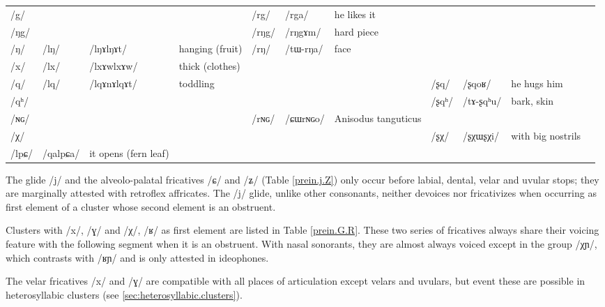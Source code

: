 \documentclass[oldfontcommands,oneside,a4paper,11pt]{article}
\newcommand{\ipa}[1]{{\phon/#1/}} %
\newcommand{\deux}[1]{/#1/}
\newcommand{\trois}[1]{/#1/}
\newcommand{\idph}[1]{\cellcolor{gray}\textbf{#1}}
\begin{document}
\begin{table}
{\begin{tabular}{l|lll|lll|lll|l}
\ipa{g}  & 	  & 	  & 	  & 	 \deux{rg}  & 	 \ipa{rga}  & 	 he likes it & 	 & 	 & 	 & 	\\	
\ipa{ŋg}  & 	  & 	  & 	  & 	 \deux{rŋg}  & 	 \ipa{rŋgɤm}  & 	hard piece  & 	 & 	 & 	 & 	\\	
\ipa{ŋ}  & 	 \deux{lŋ} \idph{}  & 	 \ipa{lŋɤlŋɤt}  & 	hanging (fruit)  & 	 \deux{rŋ}  & 	 \ipa{tɯ-rŋa}  & 	 face & 	 & 	 & 	 & 	\\	
\ipa{x}  & 	 \deux{lx} \idph{}  & 	 \ipa{lxɤwlxɤw}  & 	thick (clothes)  & 	  & 	  & 	  & 	 & 	 & 	 & 	\\	
\ipa{q}  & 	\deux{lq}  & \ipa{lqɤnɤlqɤt}	  &toddling	  & 	 & 	 & 	 & 	 \deux{ʂq}  & 	 \ipa{ʂqoʁ}  & 	he hugs him  & 	\\	
\ipa{qʰ}  & 	  & 	  & 	  & 	 & 	 & 	 & 	 \deux{ʂqʰ}  & 	 \ipa{tɤ-ʂqʰu}  & 	bark, skin & 	\\	
\ipa{ɴɢ}  & 	  & 	  & 	  & 	 \deux{rɴɢ}  & 	 \ipa{ɕɯrɴɢo}  & 	Anisodus tanguticus  & 	 & 	 & 	 & 	\\	
\ipa{χ}  & 	  & 	  & 	  & 	 & 	 & 	 & 	 \deux{ʂχ}  & 	 \ipa{ʂχɯʂχi}  & 	with big nostrils  & 	\\	
\midrule
\trois{lpɕ}	&\ipa{qalpɕa} & it opens (fern leaf) \\
\bottomrule
\end{tabular}}
\end{table}
 
  The glide /j/  and the alveolo-palatal fricatives /ɕ/ and /ʑ/ (Table \ref{prein.j.Z}) only occur before labial, dental, velar and uvular stops; they are marginally attested with retroflex affricates. The \ipa{j} glide, unlike other consonants, neither devoices nor fricativizes when occurring as first element of a cluster whose second element is an obstruent.


  Clusters with   /x/, /ɣ/ and /χ/, /ʁ/ as first element are listed in Table \ref{prein.G.R}. These two series of fricatives  always share their voicing feature with the following segment when it is an obstruent. With nasal sonorants, they are  almost always voiced except in the group \ipa{χɲ}, which contrasts with \ipa{ʁɲ} and is only attested in ideophones.
  
 
  The velar fricatives /x/ and /ɣ/ are compatible with all places of articulation except velars and uvulars, but event these are possible in heterosyllabic clusters (see \ref{sec:heterosyllabic.clusters}).
  
\end{document}
